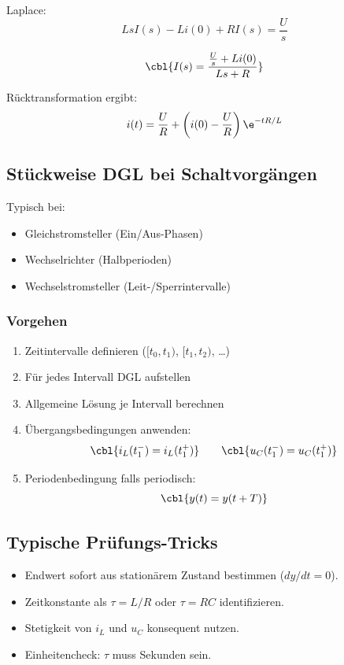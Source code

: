 Laplace:
\[
LsI(s)-L i(0)+RI(s)=\frac{U}{s}
\]

\[
\cbl{I(s)=\frac{\frac{U}{s}+L i(0)}{Ls+R}}
\]

Rücktransformation ergibt:
\[
i(t)=\frac{U}{R}+\left(i(0)-\frac{U}{R}\right)\e^{-tR/L}
\]

\subsection{Stückweise DGL bei Schaltvorgängen}

Typisch bei:
\begin{itemize}
    \item Gleichstromsteller (Ein/Aus-Phasen)
    \item Wechselrichter (Halbperioden)
    \item Wechselstromsteller (Leit-/Sperrintervalle)
\end{itemize}

\subsubsection{Vorgehen}

\begin{enumerate}
    \item Zeitintervalle definieren ($[t_0,t_1)$, $[t_1,t_2)$, \dots)
    \item Für jedes Intervall DGL aufstellen
    \item Allgemeine Lösung je Intervall berechnen
    \item Übergangsbedingungen anwenden:
    \[
    \cbl{i_L(t_1^-)=i_L(t_1^+)}
    \qquad
    \cbl{u_C(t_1^-)=u_C(t_1^+)}
    \]
    \item Periodenbedingung falls periodisch:
    \[
    \cbl{y(t)=y(t+T)}
    \]
\end{enumerate}


\subsection{Typische Prüfungs-Tricks}

\begin{itemize}
    \item Endwert sofort aus stationärem Zustand bestimmen ($dy/dt=0$).
    \item Zeitkonstante als $\tau=L/R$ oder $\tau=RC$ identifizieren.
    \item Stetigkeit von $i_L$ und $u_C$ konsequent nutzen.
    \item Einheitencheck: $\tau$ muss Sekunden sein.
\end{itemize}

